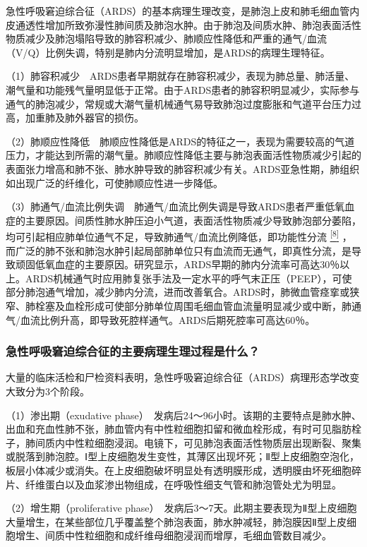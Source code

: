 急性呼吸窘迫综合征（ARDS）的基本病理生理改变，是肺泡上皮和肺毛细血管内皮通透性增加所致弥漫性肺间质及肺泡水肿。由于肺泡及间质水肿、肺泡表面活性物质减少及肺泡塌陷导致的肺容积减少、肺顺应性降低和严重的通气/血流（V/Q）比例失调，特别是肺内分流明显增加，是ARDS的病理生理特征。

（1）肺容积减少　ARDS患者早期就存在肺容积减少，表现为肺总量、肺活量、潮气量和功能残气量明显低于正常。由于ARDS患者的肺容积明显减少，实际参与通气的肺泡减少，常规或大潮气量机械通气易导致肺泡过度膨胀和气道平台压力过高，加重肺及肺外器官的损伤。

（2）肺顺应性降低　肺顺应性降低是ARDS的特征之一，表现为需要较高的气道压力，才能达到所需的潮气量。肺顺应性降低主要与肺泡表面活性物质减少引起的表面张力增高和肺不张、肺水肿导致的肺容积减少有关。ARDS亚急性期，肺组织如出现广泛的纤维化，可使肺顺应性进一步降低。

（3）肺通气/血流比例失调　肺通气/血流比例失调是导致ARDS患者严重低氧血症的主要原因。间质性肺水肿压迫小气道，表面活性物质减少导致肺泡部分萎陷，均可引起相应肺单位通气不足，导致肺通气/血流比例降低，即功能性分流
\protect\hyperlink{text00011.htmlux5cux23ch8-10}{\textsuperscript{{[}8{]}}}
，而广泛的肺不张和肺泡水肿引起局部肺单位只有血流而无通气，即真性分流，是导致顽固低氧血症的主要原因。研究显示，ARDS早期的肺内分流率可高达30％以上。ARDS机械通气时应用肺复张手法及一定水平的呼气末正压（PEEP），可使部分肺泡通气增加，减少肺内分流，进而改善氧合。ARDS时，肺微血管痉挛或狭窄、肺栓塞及血栓形成可使部分肺单位周围毛细血管血流量明显减少或中断，肺通气/血流比例升高，即导致死腔样通气。ARDS后期死腔率可高达60％。

\subsubsection{急性呼吸窘迫综合征的主要病理生理过程是什么？}

大量的临床活检和尸检资料表明，急性呼吸窘迫综合征（ARDS）病理形态学改变大致分为3个阶段。

（1）渗出期（exudative
phase）　发病后24～96小时。该期的主要特点是肺水肿、出血和充血性肺不张，肺血管内有中性粒细胞扣留和微血栓形成，有时可见脂肪栓子，肺间质内中性粒细胞浸润。电镜下，可见肺泡表面活性物质层出现断裂、聚集或脱落到肺泡腔。Ⅰ型上皮细胞发生变性，其薄区出现坏死；Ⅱ型上皮细胞空泡化，板层小体减少或消失。在上皮细胞破坏明显处有透明膜形成，透明膜由坏死细胞碎片、纤维蛋白以及血浆渗出物组成，在呼吸性细支气管和肺泡管处尤为明显。

（2）增生期（proliferative
phase）　发病后3～7天。此期主要表现为Ⅱ型上皮细胞大量增生，在某些部位几乎覆盖整个肺泡表面，肺水肿减轻，肺泡膜因Ⅱ型上皮细胞增生、间质中性粒细胞和成纤维母细胞浸润而增厚，毛细血管数目减少。

